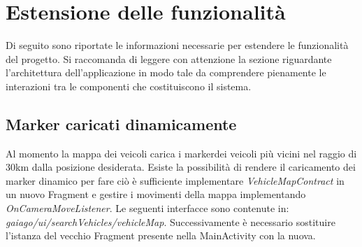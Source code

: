 \section{Estensione delle funzionalità}
Di seguito sono riportate le informazioni necessarie per estendere le funzionalità del progetto. Si raccomanda di leggere con attenzione la sezione riguardante l'architettura dell'applicazione in modo tale da comprendere pienamente le interazioni tra le componenti che costituiscono il sistema.
\subsection{Marker caricati dinamicamente}
Al momento la mappa dei veicoli carica i marker\glosp dei veicoli più vicini nel raggio di 30km dalla posizione desiderata. Esiste la possibilità di rendere il caricamento dei marker dinamico per fare ciò è sufficiente implementare \textit{VehicleMapContract} in un nuovo Fragment e gestire i movimenti della mappa implementando \textit{OnCameraMoveListener}.
Le seguenti interfacce sono contenute in:
\textit{gaiago/ui/searchVehicles/vehicleMap}.
Successivamente è necessario sostituire l'istanza del vecchio Fragment presente nella MainActivity con la nuova.